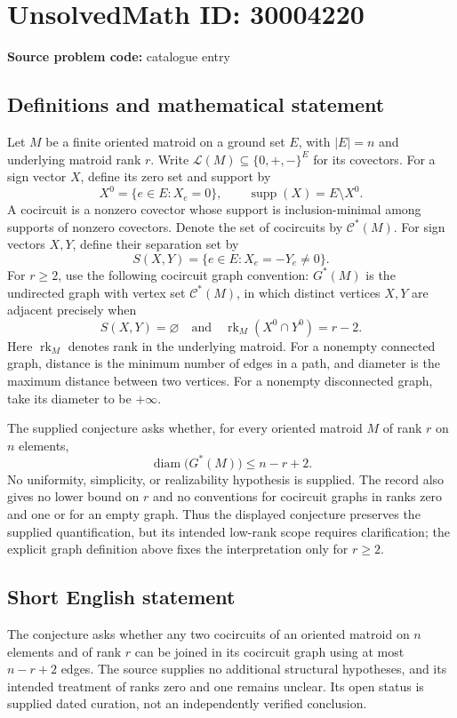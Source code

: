 \documentclass[11pt]{article}
\begin{document}
\section*{UnsolvedMath ID: 30004220}
\textbf{Source problem code:} catalogue entry
\subsection{Definitions and mathematical statement}
Let \(M\) be a finite oriented matroid on a ground set \(E\), with \(|E|=n\) and underlying matroid rank \(r\). Write \(\mathcal L(M)\subseteq\{0,+,-\}^{E}\) for its covectors. For a sign vector \(X\), define its zero set and support by
\[
X^0=\{e\in E:X_e=0\},\qquad \operatorname{supp}(X)=E\setminus X^0.
\]
A cocircuit is a nonzero covector whose support is inclusion-minimal among supports of nonzero covectors. Denote the set of cocircuits by \(\mathcal C^*(M)\). For sign vectors \(X,Y\), define their separation set by
\[
S(X,Y)=\{e\in E:X_e=-Y_e\ne0\}.
\]
For \(r\ge2\), use the following cocircuit graph convention: \(G^*(M)\) is the undirected graph with vertex set \(\mathcal C^*(M)\), in which distinct vertices \(X,Y\) are adjacent precisely when
\[
S(X,Y)=\varnothing
\quad\text{and}\quad
\operatorname{rk}_M(X^0\cap Y^0)=r-2.
\]
Here \(\operatorname{rk}_M\) denotes rank in the underlying matroid. For a nonempty connected graph, distance is the minimum number of edges in a path, and diameter is the maximum distance between two vertices. For a nonempty disconnected graph, take its diameter to be \(+\infty\).

The supplied conjecture asks whether, for every oriented matroid \(M\) of rank \(r\) on \(n\) elements,
\[
\operatorname{diam}\bigl(G^*(M)\bigr)\le n-r+2.
\]
No uniformity, simplicity, or realizability hypothesis is supplied. The record also gives no lower bound on \(r\) and no conventions for cocircuit graphs in ranks zero and one or for an empty graph. Thus the displayed conjecture preserves the supplied quantification, but its intended low-rank scope requires clarification; the explicit graph definition above fixes the interpretation only for \(r\ge2\).
\subsection{Short English statement}
The conjecture asks whether any two cocircuits of an oriented matroid on \(n\) elements and of rank \(r\) can be joined in its cocircuit graph using at most \(n-r+2\) edges. The source supplies no additional structural hypotheses, and its intended treatment of ranks zero and one remains unclear. Its open status is supplied dated curation, not an independently verified conclusion.
\end{document}
